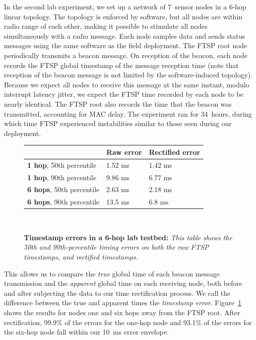 In the second lab experiment, we set up a network of 7~sensor nodes in a
6-hop linear topology. The topology is enforced by software, but all nodes
are within radio range of each other, making it possible to stimulate all
nodes simultaneously with a radio message.  Each node samples data and sends
status messages using the same software as the field deployment. The FTSP
root node periodically transmits a beacon message. On reception of the
beacon, each node records the FTSP global timestamp of the message reception
time (note that reception of the beacon message is not limited by the
software-induced topology).  Because we expect all nodes to receive this
message at the same instant, modulo interrupt latency jitter, we expect the
FTSP time recorded by each node to be nearly identical. The FTSP root also
records the time that the beacon was transmitted, accounting for MAC delay.
The experiment ran for 34~hours, during which time FTSP experienced
instabilities similar to those seen during our deployment.

\begin{figure}
\begin{tabular}{|lll|} \hline
                  & {\bf Raw error} & {\bf Rectified error} \\ \hline
{\bf  1 hop}, 50th percentile & 1.52 ms & 1.42 ms \\ 
{\bf 1 hop}, 90th percentile & 9.86 ms & 6.77 ms \\ \hline 
{\bf 6 hops}, 50th percentile & 2.63 ms & 2.18 ms \\ 
{\bf 6 hops}, 90th percentile & 13.5 ms & 6.8 ms \\ \hline 
\end{tabular} \\
\vspace{2ex}
\caption{\small {\bf Timestamp errors in a 6-hop lab testbed:}
{\em This table shows the 50th and 90th-percentile timing errors
on both the raw FTSP timestamps, and rectified timestamps.}}
\label{fig-time-rect-lab}
\end{figure}

This allows us to compare the {\em true} global time of each beacon message
transmission and the {\em apparent} global time on each receiving node, both
before and after subjecting the data to our time rectification process.  We
call the difference between the true and apparent times the {\em timestamp
error}. Figure~\ref{fig-time-rect-lab} shows the results for nodes one and
six hops away from the FTSP root.  After rectification, 99.9\% of the errors
for the one-hop node and 93.1\% of the errors for the six-hop node fall
within our 10~ms error envelope.


